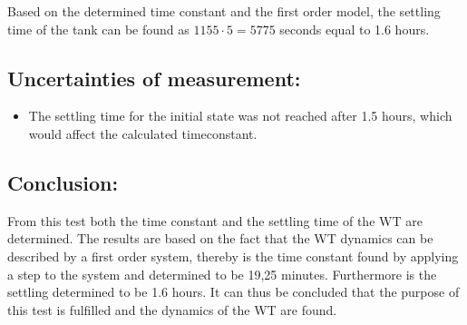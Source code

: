 Based on the determined time constant and the first order model, the settling time of the tank can be found as $1155\cdot 5 = 5775$ seconds equal to 1.6 hours.

\subsection*{Uncertainties of measurement:}
\begin{itemize}
\item The settling time for the initial state was not reached after 1.5 hours, which would affect the calculated timeconstant.
\end{itemize}

\subsection*{Conclusion:}
From this test both the time constant and the settling time of the WT are determined. The results are based on the fact that the WT dynamics can be described by a first order system, thereby is the time constant found by applying a step to the system and determined to be 19,25 minutes. Furthermore is the settling determined to be 1.6 hours. It can thus be concluded that the purpose of this test is fulfilled and the dynamics of the WT are found.  